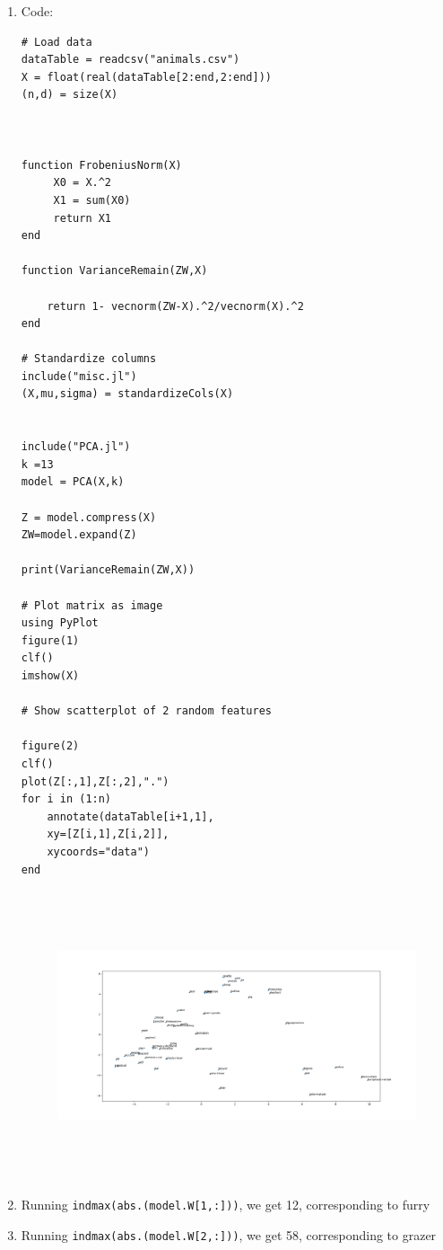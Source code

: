 \documentclass{article}
\begin{document}
\begin{enumerate}
\item  Code: 
\begin{verbatim}
# Load data
dataTable = readcsv("animals.csv")
X = float(real(dataTable[2:end,2:end]))
(n,d) = size(X)



function FrobeniusNorm(X)
     X0 = X.^2
     X1 = sum(X0)
     return X1
end

function VarianceRemain(ZW,X)

    return 1- vecnorm(ZW-X).^2/vecnorm(X).^2
end

# Standardize columns
include("misc.jl")
(X,mu,sigma) = standardizeCols(X)


include("PCA.jl")
k =13
model = PCA(X,k)

Z = model.compress(X)
ZW=model.expand(Z)

print(VarianceRemain(ZW,X))

# Plot matrix as image
using PyPlot
figure(1)
clf()
imshow(X)

# Show scatterplot of 2 random features

figure(2)
clf()
plot(Z[:,1],Z[:,2],".")
for i in (1:n)
    annotate(dataTable[i+1,1],
    xy=[Z[i,1],Z[i,2]],
    xycoords="data")
end

\end{verbatim}


\begin{figure}[h!]
    \includegraphics[width=50em,height=8.5cm]{q3_2_1_a.png}
\end{figure}
\item Running \texttt{indmax(abs.(model.W[1,:]))}, we get 12, corresponding to furry
\item Running \texttt{indmax(abs.(model.W[2,:]))}, we get 58, corresponding to grazer
\end{enumerate}
\end{document}
